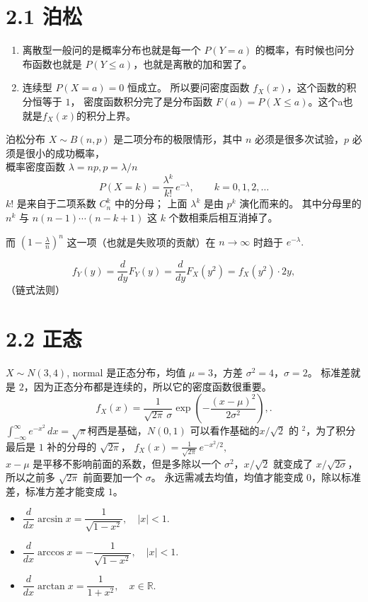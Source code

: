 \section*{2.1 泊松}
\begin{enumerate}
    \item 离散型一般问的是概率分布也就是每一个
    $P(Y=a)$ 的概率，有时候也问分布函数也就是
    $P(Y\le a)$，也就是离散的加和罢了。
    \item 连续型 $P(X=a)=0$ 恒成立。
    所以要问密度函数 $f_X(x)$，这个函数的积分恒等于 $1$，
    密度函数积分完了是分布函数
    $F(a)=P(X\le a)$。这个a也就是$f_X(x)$的积分上界。
\end{enumerate}
\begin{note}
泊松分布
$X\sim B(n,p)$ 是二项分布的极限情形，其中
$n$ 必须是很多次试验，$p$ 必须是很小的成功概率，\\
概率密度函数 $\lambda=np,p=\lambda/n$
\[
P(X=k)=\frac{\lambda^k}{k!}\,e^{-\lambda},
\qquad k=0,1,2,\dots
\] 
$k!$ 是来自于二项系数 $C_n^k$ 中的分母；  
上面 $\lambda^k$ 是由 $p^k$ 演化而来的。  
其中分母里的 $n^k$ 与
$
n(n-1)\cdots(n-k+1)
$
这 $k$ 个数相乘后相互消掉了。  

而
$
\left(1-\frac{\lambda}{n}\right)^{n}
$
这一项（也就是失败项的贡献）在 $n\to\infty$ 时趋于
$
e^{-\lambda}.
$
\end{note}
\begin{dxtips}[都给x都分布函数然后也知道该求x小于谁都概率带入就行了别积分了]
    \[
f_Y(y)
=\frac{d}{dy}F_Y(y)
=\frac{d}{dy}F_X(y^2)
= f_X(y^2)\cdot 2y,
\]
（链式法则）
\end{dxtips}
\section*{2.2 正态}
\begin{note}
$X\sim N(3,4)$, normal 是正态分布，均值 $\mu=3$，方差 $\sigma^2=4$，$\sigma=2$。
标准差就是 $2$，因为正态分布都是连续的，所以它的密度函数很重要。
$$
f_X(x)
=\frac{1}{\sqrt{2\pi}\,\sigma}
\exp\!\left(-\frac{(x-\mu)^2}{2\sigma^2}\right),
.
$$
$
\int_{-\infty}^{\infty} e^{-x^2}\,dx=\sqrt{\pi}
$柯西是基础，$N(0,1)$ 可以看作基础的$x/\sqrt{2}$ 的 $^2$，为了积分最后是 $1$ 补的分母的 $\sqrt{2\pi}$，
$
f_X(x)=\frac{1}{\sqrt{2\pi}}\,e^{-x^2/2},
$\\
$x-\mu$ 是平移不影响前面的系数，但是多除以一个 $\sigma^2$，$x/\sqrt{2}$ 就变成了 $x/\sqrt{2\sigma}$，
所以之前多 $\sqrt{2\pi}$ 前面要加一个 $\sigma$。
永远需减去均值，均值才能变成 $0$，除以标准差，标准方差才能变成 $1$。
\end{note}
\begin{itemize}
  \item $\dfrac{d}{dx}\arcsin x=\dfrac{1}{\sqrt{1-x^2}},\quad |x|<1.$
  \item $\dfrac{d}{dx}\arccos x=-\dfrac{1}{\sqrt{1-x^2}},\quad |x|<1.$
  \item $\dfrac{d}{dx}\arctan x=\dfrac{1}{1+x^2},\quad x\in\mathbb R.$
\end{itemize}
